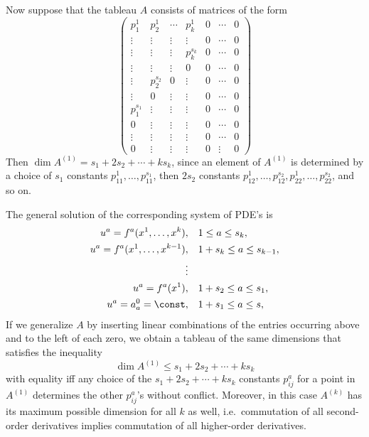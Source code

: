 \begin{example}
    Now suppose that the tableau $A$ consists of matrices of the form 
    \[
        \begin{pmatrix}
            p^1_1  &  p_2^1 & \cdots & p^1_k & 0&\cdots &0\\
            \vdots & \vdots & \vdots & \vdots & 0 & \cdots & 0\\
            \vdots & \vdots & \vdots & p^{s_k}_k & 0 &\cdots & 0\\
            \vdots & \vdots & \vdots & 0 & 0 & \cdots &0\\
            \vdots & p_2^{s_2}& 0    & \vdots & 0 &\cdots & 0\\
            \vdots & 0 & \vdots      & \vdots & 0 &\cdots & 0\\
            p_1^{s_1}& \vdots &\vdots &\vdots &0 &\cdots &0\\
            0& \vdots & \vdots & \vdots  & 0& \cdots & 0\\
            \vdots & \vdots &\vdots &\vdots & 0 &\cdots &0\\
            0& \vdots & \vdots &\vdots & 0 &\vdots & 0
        \end{pmatrix}\label{eq 5.16 Ivey}
    \]
    Then $\dim A^{(1)}=s_1+2s_2+\cdots +ks_k$, since an element of $A^{(1)}$ is determined by a choice of $s_1$ constants $p^1_{11},\ldots,p^{s_1}_{11}$, then $2s_2$ constants $p^1_{12},\ldots,p^{s_2}_{12}, p^1_{22},\ldots,p^{s_2}_{22}$, and so on.

    The general solution of the corresponding system of PDE's is 
    \begin{align}
        u^a=f^a(x^1,\ldots,x^k),&\quad 1\leq a\leq s_k,\\
        u^a=f^a(x^1,\ldots,x^{k-1}),&\quad 1+s_k\leq a\leq s_{k-1},\\
        \vdots &\\
        u^a=f^a(x^1),&\quad 1+s_2\leq a\leq s_1,\\
        u^a=a^0_a=\const,&\quad 1+s_1\leq a\leq s,
    \end{align}
    If we generalize $A$ by inserting  linear combinations of the entries occurring above and to the left of each zero, we obtain a tableau of the same dimensions that satisfies the inequality
    \[\dim A^{(1)}\leq s_1+2s_2+\cdots +ks_k\]
    with equality iff any choice of the $s_1+2s_2+\cdots +ks_k$ constants $p^a_{ij}$ for a point in $A^{(1)}$ determines the other $p^a_{ij}$'s without conflict. Moreover, in this case $A^{(k)}$ has its maximum possible dimension for all $k$ as well, i.e.\ commutation of all second-order derivatives implies commutation of all higher-order derivatives.
\end{example}


